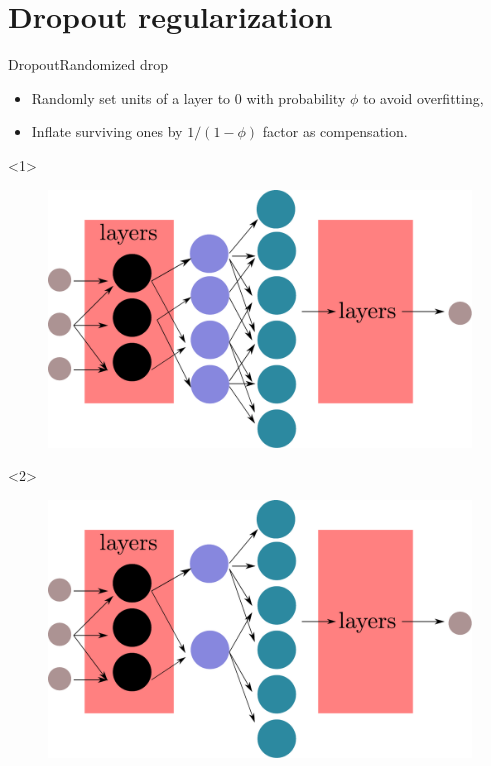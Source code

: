 \documentclass[10pt,aspectratio=43]{beamer}
\begin{document}
\section{Dropout regularization}
\begin{frame}{Dropout}{Randomized drop}
    \begin{itemize}
        \item Randomly set units of a layer to $0$ with probability $\phi$ to avoid overfitting,
        \item Inflate surviving ones by $1/(1-\phi)$ factor as compensation.
    \end{itemize}

    \begin{onlyenv}<1>
        \begin{figure}
            \centering
            \includegraphics[scale=.4]{dropout_structure.pdf}
        \end{figure}
    \end{onlyenv}
    \begin{onlyenv}<2>
        \begin{figure}
            \centering
            \includegraphics[scale=.4]{dropout_structure_applied.pdf}
        \end{figure}
    \end{onlyenv}

\end{frame}
\end{document}
